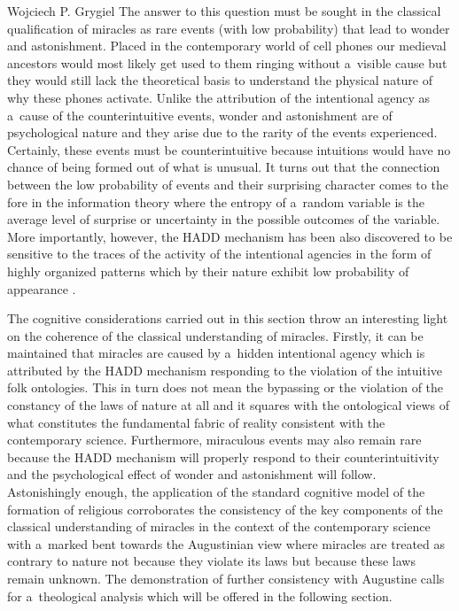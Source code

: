 \begin{artengenv}{Wojciech P. Grygiel}
The answer to this question must be sought in the classical qualification of miracles as rare events (with low probability) that lead to wonder and astonishment. Placed in the contemporary world of cell phones our medieval ancestors would most likely get used to them ringing without a~visible cause but they would still lack the theoretical basis to understand the physical nature of why these phones activate. Unlike the attribution of the intentional agency as a~cause of the counterintuitive events, wonder and astonishment are of psychological nature and they arise due to the rarity of the events experienced. Certainly, these events must be counterintuitive because intuitions would have no chance of being formed out of what is unusual. It turns out that the connection between the low probability of events and their surprising character comes to the fore in the information theory where the entropy of a~random variable is the average level of surprise or uncertainty in the possible outcomes of the variable. More importantly, however, the HADD mechanism has been also discovered to be sensitive to the traces of the activity of the intentional agencies in the form of highly organized patterns which by their nature exhibit low probability of appearance
\parencites[][pp.36–39]{barrett_why_2004}[][]{grygiel_doctrine_2020}.%


The cognitive considerations carried out in this section throw an interesting light on the coherence of the classical understanding of miracles. Firstly, it can be maintained that miracles are caused by a~hidden intentional agency which is attributed by the HADD mechanism responding to the violation of the intuitive folk ontologies. This in turn does not mean the bypassing or the violation of the constancy of the laws of nature at all and it squares with the ontological views of what constitutes the fundamental fabric of reality consistent with the contemporary science. Furthermore, miraculous events may also remain rare because the HADD mechanism will properly respond to their counterintuitivity and the psychological effect of wonder and astonishment will follow. Astonishingly enough, the application of the standard cognitive model of the formation of religious corroborates the consistency of the key components of the classical understanding of miracles in the context of the contemporary science with a~marked bent towards the Augustinian view where miracles are treated as contrary to nature not because they violate its laws but because these laws remain unknown. The demonstration of further consistency with Augustine calls for a~theological analysis which will be offered in the following section.


\end{artengenv}

